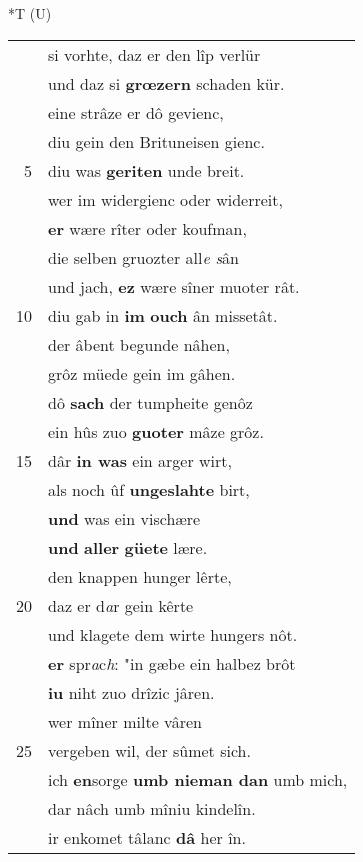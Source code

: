 \documentclass[8pt,a4paper,notitlepage]{article}
\begin{document}
\begin{table}[ht]
\hspace{0.5cm}
\begin{minipage}[t]{0.5\linewidth}
\small
\begin{center}*T (U)
\end{center}
\begin{tabular}{rl}
 & si vorhte, daz er den lîp verlür\\ 
 & und daz si \textbf{grœzern} schaden kür.\\ 
 & eine strâze er dô gevienc,\\ 
 & diu gein den Brituneisen gienc.\\ 
5 & diu was \textbf{geriten} unde breit.\\ 
 & wer im widergienc oder widerreit,\\ 
 & \textbf{er} wære rîter oder koufman,\\ 
 & die selben gruozter all\textit{e s}ân\\ 
 & und jach, \textbf{ez} wære sîner muoter rât.\\ 
10 & diu gab in \textbf{im} \textbf{ouch} ân missetât.\\ 
 & der âbent begunde nâhen,\\ 
 & grôz müede gein im gâhen.\\ 
 & dô \textbf{sach} der tumpheite genôz\\ 
 & ein hûs zuo \textbf{guoter} mâze grôz.\\ 
15 & dâr \textbf{in was} ein arger wirt,\\ 
 & als noch ûf \textbf{ungeslahte} birt,\\ 
 & \textbf{und} was ein vischære\\ 
 & \textbf{und} \textbf{aller} \textbf{güete} lære.\\ 
 & den knappen hunger lêrte,\\ 
20 & daz er d\textit{a}r gein kêrte\\ 
 & und klagete dem wirte hungers nôt.\\ 
 & \textbf{er} spr\textit{a}c\textit{h}: "in gæbe ein halbez brôt\\ 
 & \textbf{iu} niht zuo drîzic jâren.\\ 
 & wer mîner milte vâren\\ 
25 & vergeben wil, der sûmet sich.\\ 
 & ich \textbf{en}sorge \textbf{umb nieman dan} umb mich,\\ 
 & dar nâch umb mîniu kindelîn.\\ 
 & ir enkomet tâlanc \textbf{dâ} her în.\\ 

\end{tabular}
\end{minipage}
\end{table}
\end{document}
